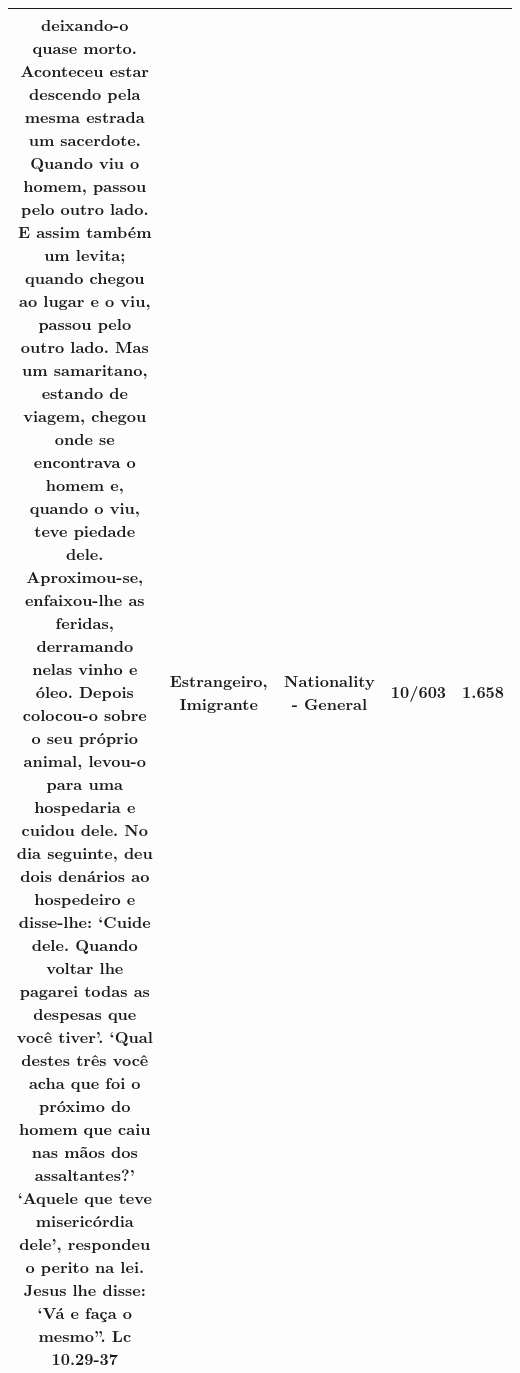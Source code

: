 \documentclass[11pt]{article}
\newlength\mylength
\begin{document}
\begin{center}
\begin{longtable}{|C{.65\mylength}|C{.30\mylength}|C{.12\mylength}|C{.12\mylength}|C{.12\mylength}|}
deixando-o quase morto. Aconteceu estar descendo pela mesma estrada um sacerdote. Quando viu o homem, passou pelo outro lado. E assim também um levita; quando chegou ao lugar e o viu, passou pelo outro lado. Mas um samaritano, estando de viagem, chegou onde se encontrava o homem e, quando o viu, teve piedade dele. Aproximou-se, enfaixou-lhe as feridas, derramando nelas vinho e óleo. Depois colocou-o sobre o seu próprio animal, levou-o para uma hospedaria e cuidou dele. No dia seguinte, deu dois denários ao hospedeiro e disse-lhe: ‘Cuide dele. Quando voltar lhe pagarei todas as despesas que você tiver'. ‘Qual destes três você acha que foi o próximo do homem que caiu nas mãos dos assaltantes?' ‘Aquele que teve misericórdia dele', respondeu o perito na lei. Jesus lhe disse: ‘Vá e faça o mesmo''. Lc 10.29-37\normalsize   & Estrangeiro, Imigrante & Nationality - General & 10/603 & 1.658 \\  \hline

\end{longtable}
\end{center}
\end{document}
